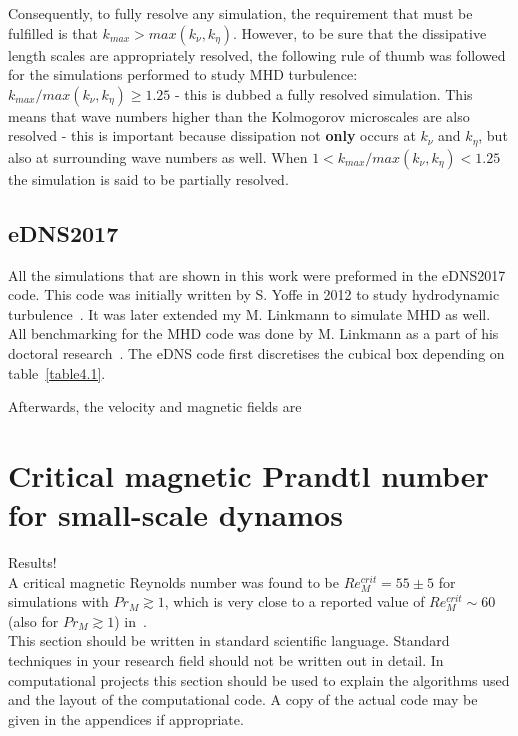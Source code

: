 \documentclass[12pt,a4paper]{report}
\begin{document}
Consequently, to fully resolve any simulation, the requirement that must be fulfilled is that $k_{max} > max(k_\nu, k_\eta)$. However, to be sure that the dissipative length scales are appropriately resolved, the following rule of thumb was followed for the simulations performed to study MHD turbulence: ${k_{max}/max(k_\nu, k_\eta)\geq1.25}$ - this is dubbed a fully resolved simulation. This means that wave numbers higher than the Kolmogorov microscales are also resolved - this is important because dissipation not \textbf{only} occurs at $k_\nu$ and $k_\eta$, but also at surrounding wave numbers as well. When $1<{k_{max}/max(k_\nu, k_\eta)<1.25}$ the simulation is said to be partially resolved. 

\section{eDNS2017}

All the simulations that are shown in this work were preformed in the eDNS2017 code. This code was initially written by S. Yoffe in 2012 to study hydrodynamic turbulence~\cite{yoffe2013investigation}. It was later extended my M. Linkmann to simulate MHD as well. All benchmarking for the MHD code was done by M. Linkmann as a part of his doctoral research~\cite{LinkmannMoritzFrederikLeon2016Spim}. The eDNS code first discretises the cubical box depending on table~\ref{table4.1}.

Afterwards, the velocity and magnetic fields are 
















\chapter{Critical magnetic Prandtl number for small-scale dynamos}

Results!\\

A critical magnetic Reynolds number was found to be $Re_M^{crit}=55\pm5$ for simulations with $Pr_M\gtrsim1$, which is very close to a reported value of $Re_M^{crit}\sim60$ (also for $Pr_M\gtrsim1$) in~\cite{schekochihin2007fluctuation}.\\



This section should be written in standard scientific
language. Standard techniques in your research field should not be
written out in detail. In computational projects this section should
be used to explain the algorithms used and the layout of the
computational code. A copy of the actual code may be given in the
appendices if appropriate.
\end{document}
